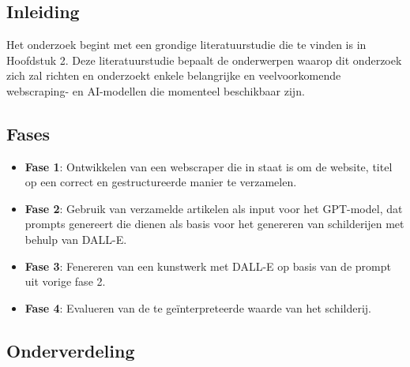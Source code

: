 
\chapter{}%
\label{ch:methodologie}

\section{Inleiding}
Het onderzoek begint met een grondige literatuurstudie die te vinden is in Hoofdstuk 2. Deze literatuurstudie bepaalt de onderwerpen waarop dit onderzoek zich zal richten en onderzoekt enkele belangrijke en veelvoorkomende webscraping- en AI-modellen die momenteel beschikbaar zijn.  \\

\section{Fases}
\begin{itemize}
    \item \textbf{Fase 1}: Ontwikkelen van een webscraper die in staat is om de website, titel op een correct en gestructureerde manier te verzamelen. 
    \item \textbf{Fase 2}: Gebruik van verzamelde artikelen als input voor het GPT-model, dat prompts genereert die dienen als basis voor het genereren van schilderijen met behulp van DALL-E.
    \item \textbf{Fase 3}: Fenereren van een kunstwerk met DALL-E op basis van de prompt uit vorige fase 2.
    \item \textbf{Fase 4}: Evalueren van de te geïnterpreteerde waarde van het schilderij. \\
\end{itemize} 

\section{Onderverdeling}

